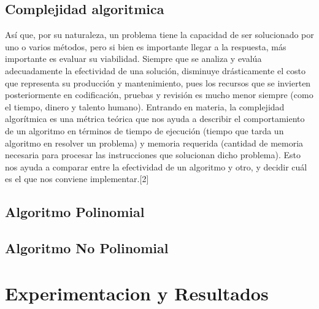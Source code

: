 \documentclass[spanish]{article}
\begin{document}
	\subsection{Complejidad algoritmica}
	Así que, por su naturaleza, un problema tiene la capacidad de ser solucionado por uno o varios métodos, pero si bien es importante llegar a la respuesta, más importante es evaluar su viabilidad. Siempre que se analiza y evalúa adecuadamente la efectividad de una solución, disminuye drásticamente el costo que representa su producción y mantenimiento, pues los recursos que se invierten posteriormente en codificación, pruebas y revisión es mucho menor siempre (como el tiempo, dinero y talento humano).	
	Entrando en materia, la complejidad algorítmica es una métrica teórica que nos ayuda a describir el comportamiento de un algoritmo en términos de tiempo de ejecución (tiempo que tarda un algoritmo en resolver un problema) y memoria requerida (cantidad de memoria necesaria para procesar las instrucciones que solucionan dicho problema). Esto nos ayuda a comparar entre la efectividad de un algoritmo y otro, y decidir cuál es el que nos conviene implementar.[2]
	\subsection{Algoritmo Polinomial}

	\subsection{Algoritmo No Polinomial}

	\section{Experimentacion y Resultados}
\end{document}
